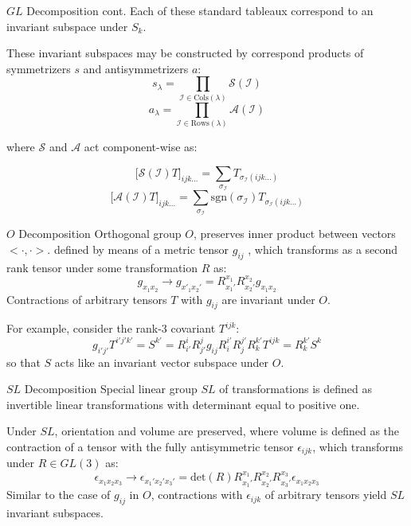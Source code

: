 \documentclass[11pt]{beamer}
\begin{document}
\begin{frame}{$GL$ Decomposition cont.}
Each of these standard tableaux correspond to an invariant subspace under $S_k$.

\medskip

These invariant subspaces may be constructed by correspond products of symmetrizers $s$ and antisymmetrizers $a$:
$$
s_{\lambda} = \prod_{\mathcal{I}\in \text{Cols}(\lambda)}\mathcal{S}(\mathcal{I})
$$
$$
a_{\lambda} = \prod_{\mathcal{I}\in \text{Rows}(\lambda)}\mathcal{A}(\mathcal{I})
$$
\begin{center}
where $\mathcal{S}$ and $\mathcal{A}$ act component-wise as:
\end{center}
$$
\big[\mathcal{S}(\mathcal{I})T\big]_{ijk...}= \sum_{\sigma_{\mathcal{I}}}T_{\sigma_{\mathcal{I}}(ijk...)}
$$
$$
\big[\mathcal{A}(\mathcal{I})T\big]_{ijk...}= \sum_{\sigma_{\mathcal{I}}}\text{sgn}(\sigma_{\mathcal{I}})T_{\sigma_{\mathcal{I}}(ijk...)}
$$
\end{frame}

\begin{frame}{$O$ Decomposition}
Orthogonal group $O$, preserves inner product between vectors $<\cdot , \cdot >$. defined by means of a metric tensor $g_{ij}$ , which transforms as a second rank tensor under some transformation $R$ as:
$$
g_{x_1x_2}\rightarrow g_{x'_1x_2'} = R_{x_1'}^{x_1} R_{x_2'}^{x_2}g_{x_1x_2}
$$
Contractions of arbitrary tensors $T$ with $g_{ij}$ are invariant under $O$.

\medskip

For example, consider the rank-3 covariant $T^{ijk}$:
$$
g_{i'j'}T^{i'j'k'} = S^{k'}= R_{i'}^{i} R_{j'}^{j} g_{ij}R_{i}^{i'} R_{j}^{j'}R_k^{k'}T^{ijk} = R_k^{k'} S^k
$$
so that $S$ acts like an invariant vector subspace under $O$.
\end{frame}
\begin{frame}{$SL$ Decomposition}
Special linear group $SL$ of transformations is defined as invertible linear transformations with determinant equal to positive one.

\medskip

Under $SL$, orientation and volume are preserved, where volume is defined as the contraction of a tensor with the fully antisymmetric tensor $\epsilon_{ijk}$, which transforms under $R\in GL(3)$ as:
$$
\epsilon_{x_1x_2x_3} \rightarrow\epsilon_{x_1'x_2'x_3'} =\text{det}(R) R_{x_1'}^{x_1} R_{x_2'}^{x_2}R_{x_3'}^{x_3}\epsilon_{x_1x_2x_3} 
$$
Similar to the case of $g_{ij}$ in $O$, contractions with $\epsilon_{ijk}$ of arbitrary tensors yield $SL$ invariant subspaces.
\end{frame}
\end{document}
